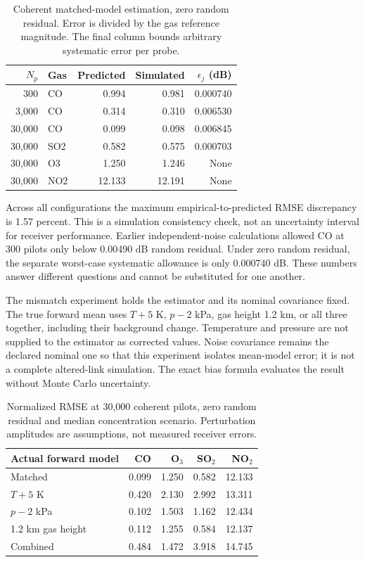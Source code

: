 \documentclass[conference]{IEEEtran}
\begin{document}
\begin{table}[t]\centering\scriptsize
\caption{Coherent matched-model estimation, zero random residual. Error is divided by the gas reference magnitude. The final column bounds arbitrary systematic error per probe.}
\setlength{\tabcolsep}{3pt}
\begin{tabular}{rlrrr}\toprule
$N_p$ & Gas & Predicted & Simulated & $\epsilon_j$ (dB)\\\midrule
300 & CO & 0.994 & 0.981 & 0.000740\\
3,000 & CO & 0.314 & 0.310 & 0.006530\\
30,000 & CO & 0.099 & 0.098 & 0.006845\\
30,000 & SO2 & 0.582 & 0.575 & 0.000703\\
30,000 & O3 & 1.250 & 1.246 & None\\
30,000 & NO2 & 12.133 & 12.191 & None\\
\bottomrule\end{tabular}\label{tab:attainable}
\end{table}

Across all configurations the maximum empirical-to-predicted RMSE discrepancy is 1.57 percent. This is a simulation consistency check, not an uncertainty interval for receiver performance. Earlier independent-noise calculations allowed CO at 300 pilots only below 0.00490 dB random residual. Under zero random residual, the separate worst-case systematic allowance is only 0.000740 dB. These numbers answer different questions and cannot be substituted for one another.

The mismatch experiment holds the estimator and its nominal covariance fixed. The true forward mean uses $T+5$ K, $p-2$ kPa, gas height 1.2 km, or all three together, including their background change. Temperature and pressure are not supplied to the estimator as corrected values. Noise covariance remains the declared nominal one so that this experiment isolates mean-model error; it is not a complete altered-link simulation. The exact bias formula evaluates the result without Monte Carlo uncertainty.

\begin{table}[t]\centering\scriptsize
\caption{Normalized RMSE at 30,000 coherent pilots, zero random residual and median concentration scenario. Perturbation amplitudes are assumptions, not measured receiver errors.}
\setlength{\tabcolsep}{3pt}
\begin{tabular}{lrrrr}\toprule
Actual forward model & CO & O$_3$ & SO$_2$ & NO$_2$\\\midrule
Matched & 0.099 & 1.250 & 0.582 & 12.133\\
$T+5$ K & 0.420 & 2.130 & 2.992 & 13.311\\
$p-2$ kPa & 0.102 & 1.503 & 1.162 & 12.434\\
1.2 km gas height & 0.112 & 1.255 & 0.584 & 12.137\\
Combined & 0.484 & 1.472 & 3.918 & 14.745\\
\bottomrule\end{tabular}\label{tab:mismatch}
\end{table}
\end{document}
